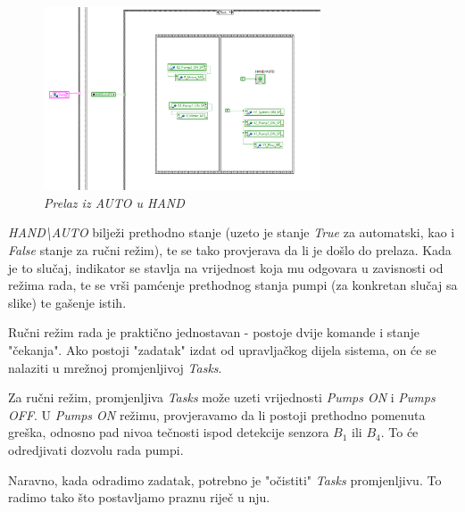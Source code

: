 \documentclass[12pt, titlepage]{article}
\begin{document}
                \begin{figure}[ht]
                    \centering
                    \includegraphics[width=0.73\textwidth]{Slike/HAND_AUTO.vi AUTO TO HAND.png}
                    \caption{\textit{Prelaz iz AUTO u HAND}}
                \end{figure}

                \newpage

                \textit{HAND\textbackslash{}AUTO} bilježi prethodno stanje (uzeto je stanje \textit{True} za automatski,
                kao i \textit{False} stanje za ručni režim), te se tako provjerava da li je došlo do prelaza.
                Kada je to slučaj, indikator se stavlja na vrijednost koja mu odgovara u zavisnosti od režima
                rada, te se vrši pamćenje prethodnog stanja pumpi (za konkretan slučaj sa slike) te gašenje
                istih.

                Ručni režim rada je praktično jednostavan - postoje dvije komande i stanje "čekanja". 
                Ako postoji "zadatak" izdat od upravljačkog dijela sistema, on će se nalaziti u 
                mrežnoj promjenljivoj \textit{Tasks}. 

                Za ručni režim, promjenljiva \textit{Tasks} može uzeti vrijednosti \textit{Pumps ON} i \textit{Pumps OFF}.
                U \textit{Pumps ON} režimu, provjeravamo da li postoji prethodno pomenuta greška, odnosno pad 
                nivoa tečnosti ispod detekcije senzora $B_1$ ili $B_4$. To će odredjivati dozvolu rada pumpi.

                Naravno, kada odradimo zadatak, potrebno je "očistiti" \textit{Tasks} promjenljivu.
                To radimo tako što postavljamo praznu riječ u nju.
\end{document}
